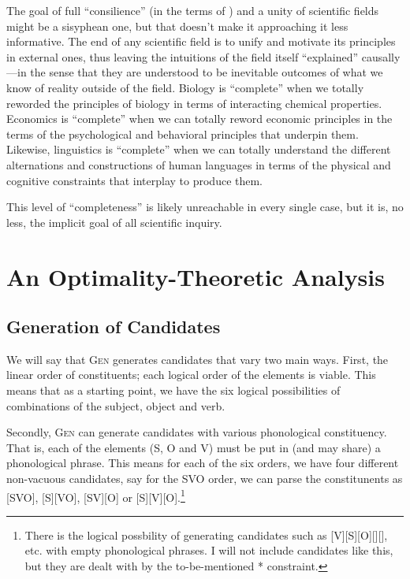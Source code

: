 \documentclass{article}
\newcommand{\nophi}{\textsc{*\textphi}}
\begin{document}
The goal of full ``consilience'' (in the terms of \textcite{wilson98}) and a unity of scientific fields might be a sisyphean one, but that doesn't make it approaching it less informative. The end of any scientific field is to unify and motivate its principles in external ones, thus leaving the intuitions of the field itself ``explained'' causally---in the sense that they are understood to be inevitable outcomes of what we know of reality outside of the field. Biology is ``complete'' when we totally reworded the principles of biology in terms of interacting chemical properties. Economics is ``complete'' when we can totally reword economic principles in the terms of the psychological and behavioral principles that underpin them. Likewise, linguistics is ``complete'' when we can totally understand the different alternations and constructions of human languages in terms of the physical and cognitive constraints that interplay to produce them.

This level of ``completeness'' is likely unreachable in every single case, but it is, no less, the implicit goal of all scientific inquiry.



\section{An Optimality-Theoretic Analysis}

\subsection{Generation of Candidates\label{generation}}

We will say that \textsc{Gen} generates candidates that vary two main ways. First, the linear order of constituents; each logical order of the elements is viable. This means that as a starting point, we have the six logical possibilities of combinations of the subject, object and verb.

Secondly, \textsc{Gen} can generate candidates with various phonological constituency. That is, each of the elements (S, O and V) must be put in (and may share) a phonological phrase. This means for each of the six orders, we have four different non-vacuous candidates, say for the SVO order, we can parse the constitunents as [SVO], [S][VO], [SV][O] or [S][V][O].\footnote{There is the logical possbility of generating candidates such as [V][S][O][][], etc. with empty phonological phrases. I will not include candidates like this, but they are dealt with by the to-be-mentioned {\nophi} constraint.}
\end{document}
